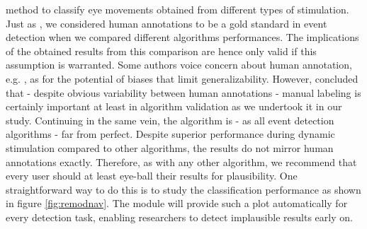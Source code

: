     method to classify eye movements obtained from different types of stimulation. \\
    Just as \cite{Andersson2017}, we considered human annotations to be a gold standard in event detection when we
    compared different algorithms performances. The implications of the obtained results from this comparison are hence
    only valid if this assumption is warranted. Some authors voice concern about human annotation, e.g. \cite{5523936},
    as for the potential of biases that limit generalizability. However, \cite{Hooge2018} concluded that - despite
    obvious variability between human annotations - manual labeling is certainly important at least in algorithm
    validation as we undertook it in our study. Continuing in the same vein, the \remodnav algorithm is - as all event
    detection algorithms - far from perfect. Despite superior performance during dynamic stimulation compared to other
    algorithms, the results do not mirror human annotations exactly. Therefore, as with any other algorithm, we recommend
    that every user should at least eye-ball their results for plausibility. One straightforward way to do this is to
    study the classification performance as shown in figure \ref{fig:remodnav}. The \remodnav module will provide such a
    plot automatically for every detection task, enabling researchers to detect implausible results early on.\\





